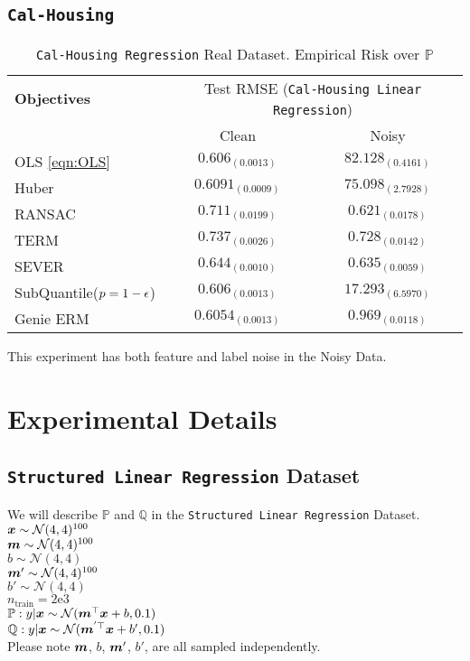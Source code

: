 \documentclass{article} %
\newcommand{\subhead}[1]{\multicolumn{1}{c}{#1}}%
\begin{document}
\begin{appendices}
	\subsection{\texttt{Cal-Housing}}
	\begin{table}[!h]
		\centering
		\begin{tabular}{lcc}
			\toprule 
			\textbf{Objectives}&\multicolumn{2}{c}{Test RMSE (\texttt{Cal-Housing Linear Regression})}\\                   
			\cmidrule(rl){2-3}
			&\subhead{Clean}& \subhead{Noisy}\\ 
			\midrule
			OLS \ref{eqn:OLS}  &$0.606_{(0.0013)}$&$82.128_{(0.4161)}$\\
			Huber \cite{Huber2009} &$0.6091_{(0.0009)}$&$75.098_{(2.7928)}$\\
			RANSAC \cite{RANSAC1981} &$0.711_{(0.0199)}$&$0.621_{(0.0178)}$\\
			TERM \cite{li2020tilted} &$0.737_{(0.0026)}$&$0.728_{(0.0142)}$\\
			SEVER \cite{DiakonikolasKKLSS19} &$0.644_{(0.0010)}$&$\mathbf{0.635_{(0.0059)}}$\\
			\rowcolor{LightCyan}
			SubQuantile($p = 1-{\epsilon}$) &$\mathbf{0.606_{(0.0013)}}$&$17.293_{(6.5970)}$\\
			\midrule 
			Genie ERM &$0.6054_{(0.0013)}$&$0.969_{(0.0118)}$\\
			\bottomrule
		\end{tabular}
		\caption{\texttt{Cal-Housing Regression} Real Dataset. Empirical Risk over $\mathbb{P}$}
		\label{tab:Cal-Housing-regression}
	\end{table}
	This experiment has both feature and label noise in the Noisy Data.
	\newpage
	
	\section{Experimental Details}\label{app:experimental-details}
	
	\subsection{\texttt{Structured Linear Regression} Dataset}
	We will describe $\mathbb{P}$ and $\mathbb{Q}$ in the \texttt{Structured Linear Regression} Dataset.\\
	${\bm{x}} \sim \mathcal{N}(4,4)^{100}$\\
	${\bm{m}} \sim \mathcal{N}(4,4)^{100}$\\
	$b \sim \mathcal{N}(4,4)$\\
	${\bm{m}}' \sim \mathcal{N}(4,4)^{100}$\\
	$b' \sim \mathcal{N}(4,4)$\\
	$n_{\text{train}} = 2\text{e}3$\\
	$\mathbb{P}: y|{\bm{x}} \sim \mathcal{N}({\bm{m}}^\top{\bm{x}} + b, 0.1)$\\
	$\mathbb{Q}: y|{\bm{x}} \sim \mathcal{N}({\bm{m}}^{'\top}{\bm{x}} + b', 0.1)$\\
	Please note ${\bm{m}}$, $b$, ${\bm{m}}'$, $b'$, are all sampled independently. 
	

\end{appendices}
\end{document}
